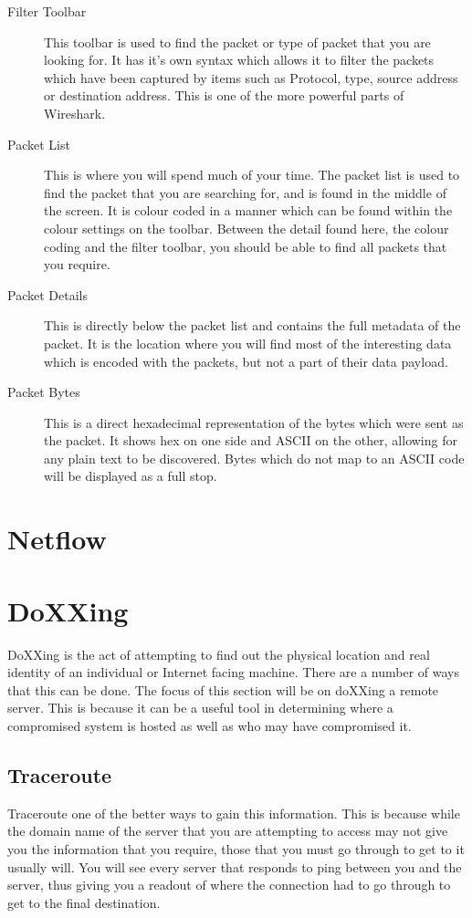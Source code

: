 			\begin{description}
				\item[Filter Toolbar] This toolbar is used to find the packet or type of packet that you are looking for. 
					It has it's own syntax which allows it to filter the packets which have been captured by items such as
					Protocol, type, source address or destination address. 
					This is one of the more powerful parts of Wireshark. 
				\item[Packet List] This is where you will spend much of your time. 
					The packet list is used to find the packet that you are searching for, and is found in the middle of the screen. 
					It is colour coded in a manner which can be found within the colour settings on the toolbar. 
					Between the detail found here, the colour coding and the filter toolbar, you should be able to find all packets that you require. 
				\item[Packet Details]
					This is directly below the packet list and contains the full metadata of the packet. 
					It is the location where you will find most of the interesting data which is encoded with the packets, but not a part of their data payload. 
				\item[Packet Bytes]
					This is a direct hexadecimal representation of the bytes which were sent as the packet. 
					It shows hex on one side and ASCII on the other, allowing for any plain text to be discovered. 
					Bytes which do not map to an ASCII code will be displayed as a full stop. 
			\end{description}
			
	\section{Netflow}
	\section{DoXXing}
		DoXXing is the act of attempting to find out the physical location and real identity of an individual or Internet facing machine. 
		There are a number of ways that this can be done. 
		The focus of this section will be on doXXing a remote server. 
		This is because it can be a useful tool in determining where a compromised system is hosted as well as who may have compromised it. 
		\subsection{Traceroute}
			Traceroute one of the better ways to gain this information. 
			This is because while the domain name of the server that you are attempting to access may not give you the information that you require, those that you must go through to get to it usually will. 
			You will see every server that responds to ping between you and the server, thus giving you a readout of where the connection had to go through to get to the final destination. 

